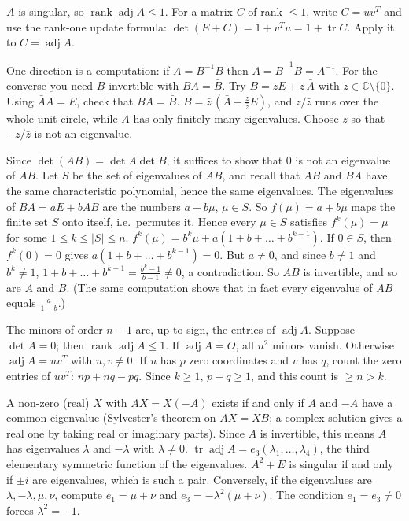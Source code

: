 \documentclass[11pt,a4paper]{article}
\begin{document}
\(A\) is singular, so \(\operatorname{rank}\operatorname{adj}A\le1\).
For a matrix \(C\) of rank \(\le1\), write \(C=uv^T\) and use the rank-one update formula: \(\det(E+C)=1+v^Tu=1+\operatorname{tr}C\). Apply it to \(C=\operatorname{adj}A\).

One direction is a computation: if \(A=B^{-1}\bar B\) then \(\bar A=\bar B^{-1}B=A^{-1}\). For the converse you need \(B\) invertible with \(BA=\bar B\).
Try \(B=zE+\bar z\,\bar A\) with \(z\in\mathbb C\setminus\{0\}\). Using \(\bar AA=E\), check that \(BA=\bar B\).
\(B=\bar z\,(\bar A+\tfrac{z}{\bar z}E)\), and \(z/\bar z\) runs over the whole unit circle, while \(\bar A\) has only finitely many eigenvalues. Choose \(z\) so that \(-z/\bar z\) is not an eigenvalue.

Since \(\det(AB)=\det A\det B\), it suffices to show that \(0\) is not an eigenvalue of \(AB\). Let \(S\) be the set of eigenvalues of \(AB\), and recall that \(AB\) and \(BA\) have the same characteristic polynomial, hence the same eigenvalues.
The eigenvalues of \(BA=aE+bAB\) are the numbers \(a+b\mu\), \(\mu\in S\). So \(f(\mu)=a+b\mu\) maps the finite set \(S\) onto itself, i.e.\ permutes it. Hence every \(\mu\in S\) satisfies \(f^k(\mu)=\mu\) for some \(1\le k\le\lvert S\rvert\le n\).
\(f^k(\mu)=b^k\mu+a(1+b+\dots+b^{k-1})\). If \(0\in S\), then \(f^k(0)=0\) gives \(a(1+b+\dots+b^{k-1})=0\). But \(a\ne0\), and since \(b\ne1\) and \(b^k\ne1\), \(1+b+\dots+b^{k-1}=\frac{b^k-1}{b-1}\ne0\), a contradiction. So \(AB\) is invertible, and so are \(A\) and \(B\). (The same computation shows that in fact every eigenvalue of \(AB\) equals \(\frac a{1-b}\).)

The minors of order \(n-1\) are, up to sign, the entries of \(\operatorname{adj}A\). Suppose \(\det A=0\); then \(\operatorname{rank}\operatorname{adj}A\le1\).
If \(\operatorname{adj}A=O\), all \(n^2\) minors vanish. Otherwise \(\operatorname{adj}A=uv^T\) with \(u,v\ne0\). If \(u\) has \(p\) zero coordinates and \(v\) has \(q\), count the zero entries of \(uv^T\): \(np+nq-pq\). Since \(k\ge1\), \(p+q\ge1\), and this count is \(\ge n\gt k\).

A non-zero (real) \(X\) with \(AX=X(-A)\) exists if and only if \(A\) and \(-A\) have a common eigenvalue (Sylvester's theorem on \(AX=XB\); a complex solution gives a real one by taking real or imaginary parts). Since \(A\) is invertible, this means \(A\) has eigenvalues \(\lambda\) and \(-\lambda\) with \(\lambda\ne0\).
\(\operatorname{tr}\operatorname{adj}A=e_3(\lambda_1,\dots,\lambda_4)\), the third elementary symmetric function of the eigenvalues. \(A^2+E\) is singular if and only if \(\pm i\) are eigenvalues, which is such a pair.
Conversely, if the eigenvalues are \(\lambda,-\lambda,\mu,\nu\), compute \(e_1=\mu+\nu\) and \(e_3=-\lambda^2(\mu+\nu)\). The condition \(e_1=e_3\ne0\) forces \(\lambda^2=-1\).
\end{document}
